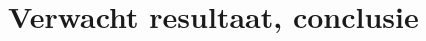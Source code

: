 \begin{comment}
In de derde fase volgt een nabootsing van een realistische Linux-omgeving. Aan de hand van geautomatiseerde configuraties ontstaat de mogelijkheid om een omgeving op te zetten. Hierbij wordt Ansible als Configuration Management tool ingezet voor het opzetten van de infrastructuur. In de testomgeving voorzien we vier virtuele servers en een virtuele client. Waarbij alle virtuele machines AlmaLinux \autocite{AOF2022} als distributie gebruiken. De eerste server maakt gebruik van BIND \autocite{ISC2022} om de DNS (Domain Name System) te voorzien. De tweede server voorziet DHCP (Dynamic Host Configuration Protocol) met dynamische IP-adressen voor de virtuele client. De derde server fungeert als webserver en databank met een \textcite{WordPress2022} installatie. De laatste server maakt gebruik van Prometheus \autocite{PrometheusAuthors2022} en Grafana \autocite{GrafanaLabs2022} om de servers te kunnen monitoren. De client is een gebruiker van het domein en test de beschikbare functionaliteiten.

De laatste fase omvat een Disaster Recovery-scenario waarbij de omgeving wordt beschadigd. Door deze beschadiging wordt de omgeving nogmaals opgezet aan de hand van automatisatie uit de tweede fase. Er wordt gekeken naar welke impact de automatisatie heeft in vergelijking met de manuele manier van configureren. Deze impact wordt geanalyseerd en getest, nadien worden alle bevinden verwerkt in de scriptie.

\end{comment}


\section{Verwacht resultaat, conclusie}%
\label{sec:verwachte_resultaten}

